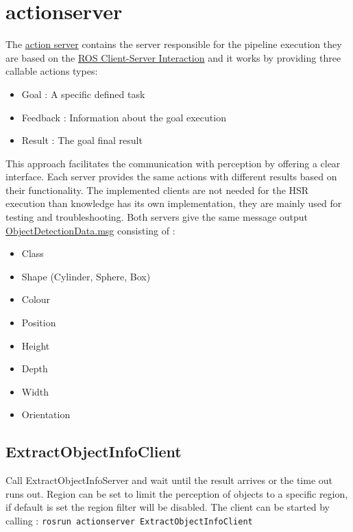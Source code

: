 \documentclass[main.tex]{subfiles}
\begin{document}
		\section{actionserver}
The \href{https://github.com/SUTURO/suturo_perception/tree/master/actionserver}{action server} contains the server responsible for the pipeline execution they are based on the \href{http://wiki.ros.org/actionlib}{ROS Client-Server Interaction} and it works by providing three callable actions types:
\begin{itemize}
	\item Goal : A specific defined task 
	\item Feedback : Information about the goal execution  
	\item Result : The goal final result 
\end{itemize}
This approach facilitates the communication with perception by offering a clear interface.
Each server provides the same actions with different results based on their functionality.
The implemented clients are not needed for the HSR execution than knowledge has its own implementation, they are mainly used for testing and troubleshooting. 
Both servers give the same message output \href{https://github.com/SUTURO/suturo_resources/blob/master/messages/suturo_perception_msgs/msg/ObjectDetectionData.msg}{ObjectDetectionData.msg} consisting of : 

	\begin{itemize}
	\item Class
	\item Shape (Cylinder, Sphere, Box)
	\item Colour
	\item Position
	\item Height
	\item Depth
	\item Width
	\item Orientation
	\end{itemize}

			\subsection{ExtractObjectInfoClient}
Call ExtractObjectInfoServer and wait until the result arrives or the time out runs out. Region can be set to limit the perception of objects to a specific region, if default is set the region filter will be disabled. The client can be started by calling : \texttt{rosrun actionserver ExtractObjectInfoClient}
\end{document}
